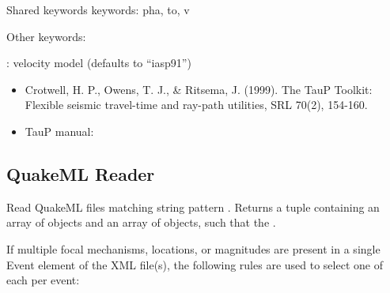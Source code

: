 \documentclass[letterpaper,11pt,english]{sphinxmanual}
\begin{document}
\begin{DUlineblock}{0em}
\item[] Shared keywords keywords: pha, to, v
\item[] Other keywords:
\item[] : velocity model (defaults to “iasp91”)
\end{DUlineblock}

\begin{itemize}
\item {} 
Crotwell, H. P., Owens, T. J., \& Ritsema, J. (1999). The TauP Toolkit: Flexible seismic travel-time and ray-path utilities, SRL 70(2), 154-160.

\item {} 
TauP manual: 

\end{itemize}


\subsection{QuakeML Reader}
\label{\detokenize{src/Submodules/quake:quakeml-reader}}

\begin{fulllineitems}
\label{\detokenize{src/Submodules/quake:read_qml}}
\end{fulllineitems}


Read QuakeML files matching string pattern . Returns a tuple containing
an array of  objects and an array of  objects, such that the
.

If multiple focal mechanisms, locations, or magnitudes are present in a single
Event element of the XML file(s), the following rules are used to select one of
each per event:
\end{document}
